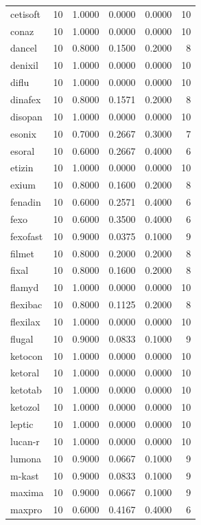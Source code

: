 \begin{longtable}{p{3.0cm}rrrrr}
cetisoft & 10 & 1.0000 & 0.0000 & 0.0000 & 10 \\
conaz & 10 & 1.0000 & 0.0000 & 0.0000 & 10 \\
dancel & 10 & 0.8000 & 0.1500 & 0.2000 & 8 \\
denixil & 10 & 1.0000 & 0.0000 & 0.0000 & 10 \\
diflu & 10 & 1.0000 & 0.0000 & 0.0000 & 10 \\
dinafex & 10 & 0.8000 & 0.1571 & 0.2000 & 8 \\
disopan & 10 & 1.0000 & 0.0000 & 0.0000 & 10 \\
esonix & 10 & 0.7000 & 0.2667 & 0.3000 & 7 \\
esoral & 10 & 0.6000 & 0.2667 & 0.4000 & 6 \\
etizin & 10 & 1.0000 & 0.0000 & 0.0000 & 10 \\
exium & 10 & 0.8000 & 0.1600 & 0.2000 & 8 \\
fenadin & 10 & 0.6000 & 0.2571 & 0.4000 & 6 \\
fexo & 10 & 0.6000 & 0.3500 & 0.4000 & 6 \\
fexofast & 10 & 0.9000 & 0.0375 & 0.1000 & 9 \\
filmet & 10 & 0.8000 & 0.2000 & 0.2000 & 8 \\
fixal & 10 & 0.8000 & 0.1600 & 0.2000 & 8 \\
flamyd & 10 & 1.0000 & 0.0000 & 0.0000 & 10 \\
flexibac & 10 & 0.8000 & 0.1125 & 0.2000 & 8 \\
flexilax & 10 & 1.0000 & 0.0000 & 0.0000 & 10 \\
flugal & 10 & 0.9000 & 0.0833 & 0.1000 & 9 \\
ketocon & 10 & 1.0000 & 0.0000 & 0.0000 & 10 \\
ketoral & 10 & 1.0000 & 0.0000 & 0.0000 & 10 \\
ketotab & 10 & 1.0000 & 0.0000 & 0.0000 & 10 \\
ketozol & 10 & 1.0000 & 0.0000 & 0.0000 & 10 \\
leptic & 10 & 1.0000 & 0.0000 & 0.0000 & 10 \\
lucan-r & 10 & 1.0000 & 0.0000 & 0.0000 & 10 \\
lumona & 10 & 0.9000 & 0.0667 & 0.1000 & 9 \\
m-kast & 10 & 0.9000 & 0.0833 & 0.1000 & 9 \\
maxima & 10 & 0.9000 & 0.0667 & 0.1000 & 9 \\
maxpro & 10 & 0.6000 & 0.4167 & 0.4000 & 6 \\

\end{longtable}
